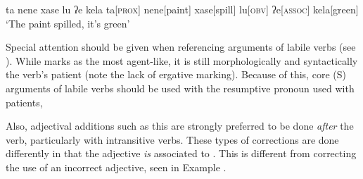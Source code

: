 \ex
\begingl
\glpreamble ta nene xase lu ʔe kela
\endpreamble
ta[\textsc{prox}]
nene[paint]
xase[spill]
lu[\textsc{obv}]
ʔe[\textsc{assoc}]
kela[green]
\glft `The paint spilled, it's green'
\endgl
\xe


Special attention should be given when referencing arguments of labile verbs (see ). While  marks  as the most agent-like, it is still morphologically and syntactically the verb's patient (note the lack of ergative marking). Because of this, core (S) arguments of labile verbs should be used with the resumptive pronoun used with patients, 

Also, adjectival additions such as this are strongly preferred to be done \textit{after} the verb, particularly with intransitive verbs. These types of corrections are done differently in that the adjective \textit{is} associated to . This is different from correcting the use of an incorrect adjective, seen in Example .